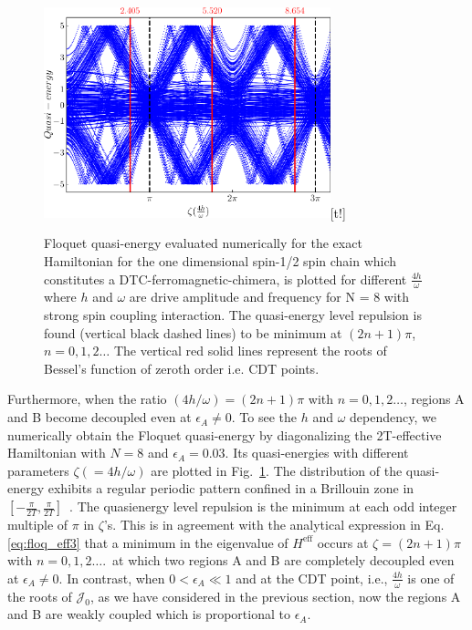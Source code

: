 \documentclass[%
reprint,
superscriptaddress,
amsmath,amssymb,showkeys,
aps,
prb,
]{revtex4-2}
\begin{document}
	\begin{figure}
		\centering
		\includegraphics[width=8.3cm]{quasienergy_8.pdf}[t!]	
		\caption{Floquet quasi-energy evaluated numerically for the exact Hamiltonian for the one dimensional spin-1/2 spin chain which constitutes a DTC-ferromagnetic-chimera, is plotted for different $\frac{4h}{\omega}$ where $h$ and $\omega$ are drive amplitude and frequency for N = 8 with strong spin coupling interaction. The quasi-energy level repulsion is found (vertical black dashed lines) to be minimum at $(2n+1)\pi$, $n=0,1,2\dots$ The vertical red solid lines represent the roots of Bessel's function of zeroth order i.e. CDT points.}
		\label{Fig:quasienergy}
	\end{figure}
	
	Furthermore, when the ratio $({4h}/{\omega}) = (2n+1)\pi$ with $n = 0,1,2\dots$, regions A and B become decoupled even at $\epsilon_A \neq 0$. To see the $h$ and $\omega$ dependency, we numerically obtain the Floquet quasi-energy by diagonalizing the 2T-effective Hamiltonian with $N=8$ and $\epsilon_A=0.03$. Its quasi-energies with different parameters $\zeta( = {4h}/{\omega})$ are plotted in Fig.~\ref{Fig:quasienergy}. The distribution of the quasi-energy exhibits a regular periodic pattern confined in a Brillouin zone in $[-\frac{\pi}{2T}, \frac{\pi}{2T}]$~\cite{dutta2014}. The quasienergy level repulsion is the minimum at each odd integer multiple of $\pi$ in  $\zeta$'s. This is in agreement with the analytical expression in Eq.\eqref{eq:floq_eff3} that a minimum in the eigenvalue of $H^{\mathrm{eff}}$ occurs at $\zeta = (2n+1)\pi$ with $n=0,1,2\dots$.\, at which two regions A and B are completely decoupled even at $\epsilon_A \neq 0$. In contrast, when $0 < \epsilon_A \ll 1 $ and at the CDT point, i.e., $\frac{4h}{\omega}$ is one of the roots of $\mathcal{J}_0$, as we have considered in the previous section, now the regions A and B are weakly coupled which is proportional to $\epsilon_A$. 	
	
\end{document}
